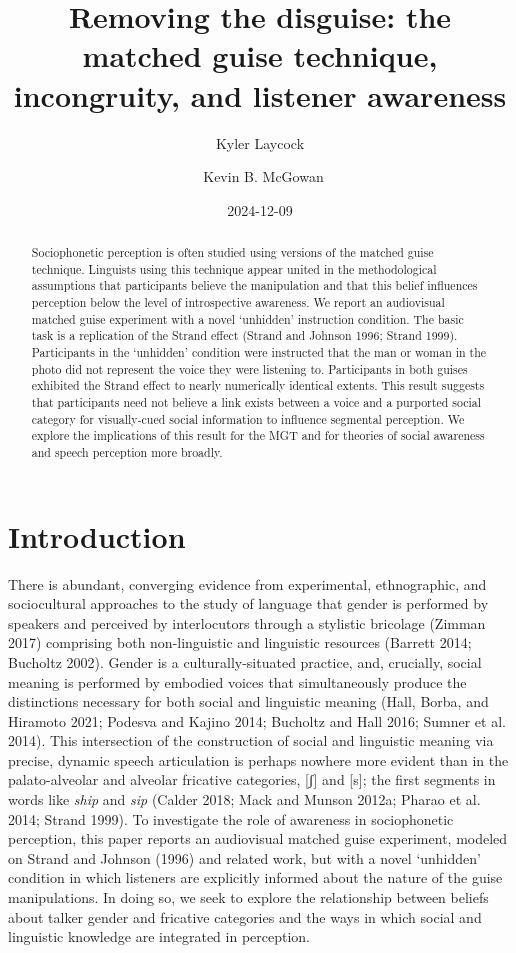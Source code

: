 \documentclass[
  letterpaper,
  DIV=11,
  numbers=noendperiod]{scrartcl}
\title{Removing the disguise: the matched guise technique, incongruity,
and listener awareness}
\author{Kyler Laycock \and ~Kevin B. McGowan}
\date{2024-12-09}
\begin{document}
\maketitle
\begin{abstract}
Sociophonetic perception is often studied using versions of the matched
guise technique. Linguists using this technique appear united in the
methodological assumptions that participants believe the manipulation
and that this belief influences perception below the level of
introspective awareness. We report an audiovisual matched guise
experiment with a novel `unhidden' instruction condition. The basic task
is a replication of the Strand effect (Strand and Johnson 1996; Strand
1999). Participants in the `unhidden' condition were instructed that the
man or woman in the photo did not represent the voice they were
listening to. Participants in both guises exhibited the Strand effect to
nearly numerically identical extents. This result suggests that
participants need not believe a link exists between a voice and a
purported social category for visually-cued social information to
influence segmental perception. We explore the implications of this
result for the MGT and for theories of social awareness and speech
perception more broadly.
\end{abstract}


\section{Introduction}\label{sec-intro}

There is abundant, converging evidence from experimental, ethnographic,
and sociocultural approaches to the study of language that gender is
performed by speakers and perceived by interlocutors through a stylistic
bricolage (Zimman 2017) comprising both non-linguistic and linguistic
resources (Barrett 2014; Bucholtz 2002). Gender is a culturally-situated
practice, and, crucially, social meaning is performed by embodied voices
that simultaneously produce the distinctions necessary for both social
and linguistic meaning (Hall, Borba, and Hiramoto 2021; Podesva and
Kajino 2014; Bucholtz and Hall 2016; Sumner et al. 2014). This
intersection of the construction of social and linguistic meaning via
precise, dynamic speech articulation is perhaps nowhere more evident
than in the palato-alveolar and alveolar fricative categories, {[}ʃ{]}
and {[}s{]}; the first segments in words like \emph{ship} and \emph{sip}
(Calder 2018; Mack and Munson 2012a; Pharao et al. 2014; Strand 1999).
To investigate the role of awareness in sociophonetic perception, this
paper reports an audiovisual matched guise experiment, modeled on Strand
and Johnson (1996) and related work, but with a novel `unhidden'
condition in which listeners are explicitly informed about the nature of
the guise manipulations. In doing so, we seek to explore the
relationship between beliefs about talker gender and fricative
categories and the ways in which social and linguistic knowledge are
integrated in perception.
\end{document}
